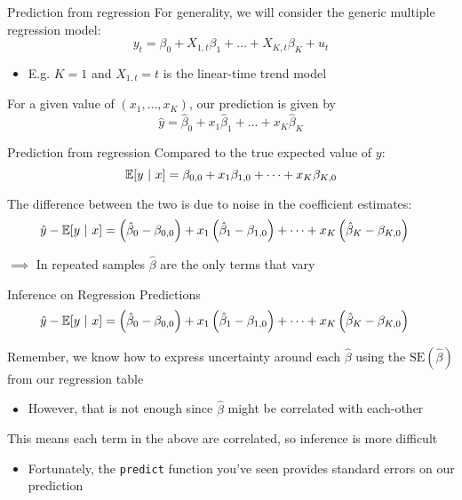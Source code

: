\documentclass[aspectratio=169,t,11pt,table]{beamer}
\begin{document}
\begin{frame}{Prediction from regression}
  For generality, we will consider the generic multiple regression model:
  $$
    y_t = \beta_0 + X_{1,t} \beta_1 + \dots + X_{K,t} \beta_K + u_t
  $$
  
  \begin{itemize}
    \item E.g. $K = 1$ and $X_{1,t}= t$ is the linear-time trend model
  \end{itemize}

  \bigskip
  For a given value of $(x_{1}, \dots, x_{K})$, our prediction is given by
  $$
    \hat{y} = \hat{\beta}_0 + x_1 \hat{\beta}_1 + \dots + x_K \hat{\beta}_K
  $$
\end{frame}

\begin{frame}{Prediction from regression}
  Compared to the true expected value of $y$:
  $$
    \expec{y}{x} = \beta_{0,0} + x_1 \beta_{1,0} + \dots + x_K \beta_{K,0}
  $$

  \bigskip
  The difference between the two is due to noise in the coefficient estimates:
  \begin{align*}
    \hat{y} - \expec{y}{x} &= 
    \left( \hat{\beta}_0 - \beta_{0,0} \right) + x_1 \left( \hat{\beta}_1 - \beta_{1,0} \right) + \dots + x_K \left( \hat{\beta}_K - \beta_{K,0} \right) 
  \end{align*}

  \bigskip
  $\implies$ In repeated samples $\hat{\beta}$ are the only terms that vary
\end{frame}

\begin{frame}{Inference on Regression Predictions}
  \vspace*{-\bigskipamount}
  \begin{align*}
    \hat{y} - \expec{y}{x} &= 
    \left( \hat{\beta}_0 - \beta_{0,0} \right) + x_1 \left( \hat{\beta}_1 - \beta_{1,0} \right) + \dots + x_K \left( \hat{\beta}_K - \beta_{K,0} \right) 
  \end{align*}

  \bigskip
  Remember, we know how to express uncertainty around each $\hat{\beta}$ using the $\text{SE}(\hat{\beta})$ from our regression table
  \begin{itemize}
    \item However, that is not enough since $\hat{\beta}$ might be correlated with each-other
  \end{itemize}

  \pause
  \bigskip
  This means each term in the above are correlated, so inference is more difficult
  \begin{itemize}
    \item Fortunately, the \texttt{predict} function you've seen provides standard errors on our prediction
  \end{itemize}
\end{frame}
\end{document}
